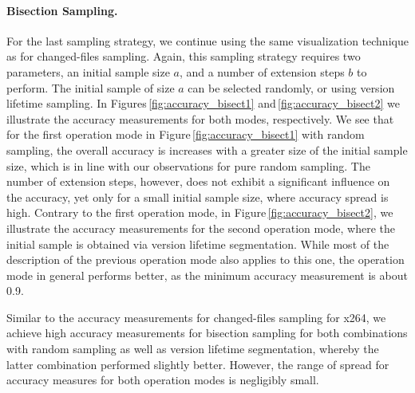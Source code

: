 \paragraph{Bisection Sampling.} 
For the last sampling strategy, we continue using the same visualization
technique as for changed-files sampling. Again, this sampling strategy requires
two parameters, an initial sample size $a$, and a number of extension steps $b$
to perform. The initial sample of size $a$ can be selected randomly, or using
version lifetime sampling. In Figures\,\ref{fig:accuracy_bisect1}
and\,\ref{fig:accuracy_bisect2} we illustrate the accuracy measurements for both modes, respectively. We see that for the first operation
mode in Figure\,\ref{fig:accuracy_bisect1} with random sampling, the overall
accuracy is increases with a greater size of the initial sample size, which is in line with our
observations for pure random sampling. The number of extension steps, however,
does not exhibit a significant influence on the accuracy, yet only for a small
initial sample size, where accuracy spread is high. Contrary to the first
operation mode, in Figure\,\ref{fig:accuracy_bisect2}, we illustrate the
accuracy measurements for the second operation mode, where the initial sample is obtained via version
lifetime segmentation. While most of the description of the previous operation
mode also applies to this one, the operation mode in general performs better, as the
minimum accuracy measurement is about 0.9.

Similar to the accuracy measurements for changed-files sampling for x264, we
achieve high accuracy measurements for bisection sampling for both combinations
with random sampling as well as version lifetime segmentation, whereby the
latter combination performed slightly better. However, the range of spread for
accuracy measures for both operation modes is negligibly small.

